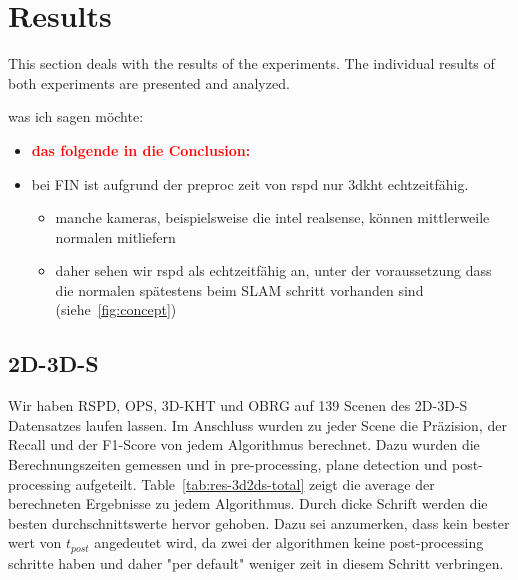 \documentclass[main.tex]{subfiles}
\begin{document}
\section{Results}
This section deals with the results of the experiments. The individual results of both experiments are presented and analyzed.

was ich sagen möchte:
\begin{itemize}
    \item \textbf{\textcolor{red}{das folgende in die Conclusion:}}
    \item bei FIN ist aufgrund der preproc zeit von rspd nur 3dkht echtzeitfähig.
          \begin{itemize}
              \item manche kameras, beispielsweise die intel realsense, können mittlerweile normalen mitliefern
              \item daher sehen wir rspd als echtzeitfähig an, unter der voraussetzung dass die normalen spätestens beim SLAM schritt vorhanden
                    sind (siehe~\ref{fig:concept})
          \end{itemize}
\end{itemize}

\subsection{2D-3D-S}

Wir haben RSPD, OPS, 3D-KHT und OBRG auf 139 Scenen des 2D-3D-S Datensatzes laufen lassen. Im Anschluss wurden zu jeder Scene die Präzision,
der Recall und der F1-Score von jedem Algorithmus berechnet. Dazu wurden die Berechnungszeiten gemessen und in pre-processing, plane detection und
post-processing aufgeteilt. Table~\ref{tab:res-3d2ds-total} zeigt die average der berechneten Ergebnisse zu jedem Algorithmus. Durch dicke Schrift
werden die besten durchschnittswerte hervor gehoben. Dazu sei anzumerken, dass kein bester wert von $t_{post}$ angedeutet wird, da zwei der algorithmen
keine post-processing schritte haben und daher "per default" weniger zeit in diesem Schritt verbringen.
\end{document}
